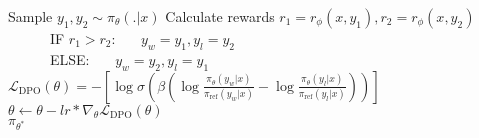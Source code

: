 \begin{figure*}[htbp]
\begin{algorithm}[H]
\begin{algorithmic}[1]
    \State Sample $y_1,y_2 \sim \pi_\theta(.|x)$ 
    \State Calculate rewards $r_1=r_\phi(x,y_1), r_2=r_\phi(x,y_2)$\\
    \ \ \ \ \ \ IF $r_1>r_2$:
    \State \ \ \ $y_w=y_1,y_l=y_2$\\
    \ \ \ \ \ \ ELSE:
    \State \ \ \ $y_w=y_2,y_l=y_1$
    \State $\mathcal{L}_{\text{DPO}}(\theta) = -\left[ \log \sigma\left( \beta \left( \log \frac{\pi_\theta(y_w | x)}{\pi_{\text{ref}}(y_w | x)} - \log \frac{\pi_\theta(y_l | x)}{\pi_{\text{ref}}(y_l | x)} \right) \right) \right]$
    \State $\theta\leftarrow\theta-lr*\nabla_{\theta}\mathcal{L}_{\text{DPO}}(\theta)$ 
\EndFor\\
\Return $\pi_{\theta^*}$ 
\end{algorithmic}
\end{algorithm}
\end{figure*}